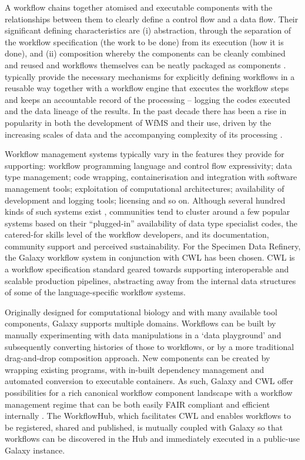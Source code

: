 A workflow chains together atomised and executable components with the
relationships between them to clearly define a control flow and a data
flow. Their significant defining characteristics are (i) abstraction,
through the separation of the workflow specification (the work to be
done) from its execution (how it is done), and (ii) composition whereby
the components can be cleanly combined and reused and workflows
themselves can be neatly packaged as components \cite{Atkinson 2017}. 
typically provide the necessary mechanisms for
explicitly defining workflows in a reusable way together with a workflow
engine that executes the workflow steps and keeps an accountable record
of the processing -- logging the codes executed and the data lineage of
the results. In the past decade there has been a rise in popularity in
both the development of \acrshort{WfMS} and their use, driven by the increasing
scales of data and the accompanying complexity of its processing
\cite{Atkinson 2017}.

Workflow management systems typically vary in the features they provide
for supporting: workflow programming language and control flow
expressivity; data type management; code wrapping, containerisation and
integration with software management tools; exploitation of
computational architectures; availability of development and logging
tools; licensing and so on. Although several hundred kinds of such
systems exist \cite{Amstutz 2021}, communities tend to cluster around a few popular
systems based on their ``plugged-in'' availability of data type
specialist codes, the catered-for skills level of the workflow
developers, and its documentation, community support and perceived
sustainability. For the Specimen Data Refinery, the Galaxy workflow
system \cite{Afgan 2018} in conjunction with \acrfull{CWL}
\cite{Crusoe 2022} has been chosen. CWL is a workflow specification standard
geared towards supporting interoperable and scalable production
pipelines, abstracting away from the internal data structures of some of
the language-specific workflow systems.

Originally designed for computational biology and with many available
tool components, Galaxy \cite{Afgan 2018} supports multiple domains. Workflows
can be built by manually experimenting with data manipulations in a
`data playground' and subsequently converting histories of those to
workflows, or by a more traditional drag-and-drop composition approach.
New components can be created by wrapping existing programs, with
in-built dependency management and automated conversion to executable
containers. As such, Galaxy and \acrshort{CWL} offer possibilities for a rich
canonical workflow component landscape with a workflow management regime
that can be both easily FAIR compliant and efficient internally
\cite{Wittenburg 2022b}. The WorkflowHub, which facilitates CWL and enables workflows
to be registered, shared and published, is mutually coupled with Galaxy
so that workflows can be discovered in the Hub and immediately executed
in a public-use Galaxy instance.

